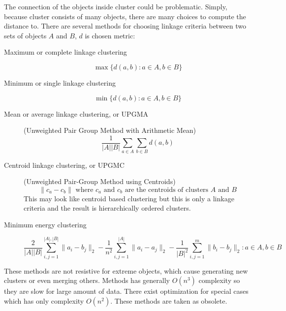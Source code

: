 \begin{description}
The connection of the objects inside cluster could be problematic. Simply, because cluster consists of many objects, there are many choices to compute the distance to. There are several methods for choosing linkage criteria between two sets of objects $A$ and $B$, $d$ is chosen metric:
\begin{description}
\item[Maximum or complete linkage clustering] $$\max\{d(a,b) : a \in A, b \in B\}$$
\item[Minimum or single linkage clustering] $$\min\{d(a,b) : a \in A, b \in B\}$$
\item[Mean or average linkage clustering, or UPGMA] (Unweighted Pair Group Method with Arithmetic Mean) $$\frac{1}{|A||B|}\sum_{a \in A} \sum_{b \in B} d(a,b)$$
\item[Centroid linkage clustering, or UPGMC] (Unweighted Pair-Group Method using Centroids) $$\|c_a - c_b\| \mbox{ where } c_a \mbox{ and } c_b \mbox{ are the centroids of clusters } A \mbox{ and } B$$
This may look like centroid based clustering but this is only a linkage criteria and the result is hierarchically ordered clusters.
\item[Minimum energy clustering] $$\frac{2}{|A||B|}\sum_{i,j=1}^{|A|,|B|}\|a_i-b_j\|_2-\frac{1}{n^2}\sum_{i,j=1}^{|A|}\|a_i-a_j\|_2-\frac{1}{|B|^2}\sum_{i,j=1}^{m}\|b_{i}-b_{j}\|_{2} : a \in A, b \in B$$
\end{description}

These methods are not resistive for extreme objects, which cause generating new clusters or even merging others. Methods has generally $O(n^3)$ complexity so they are slow for large amount of data. There exist optimization for special cases which has only complexity $O(n^2)$. These methods are taken as obsolete.


\end{description}
